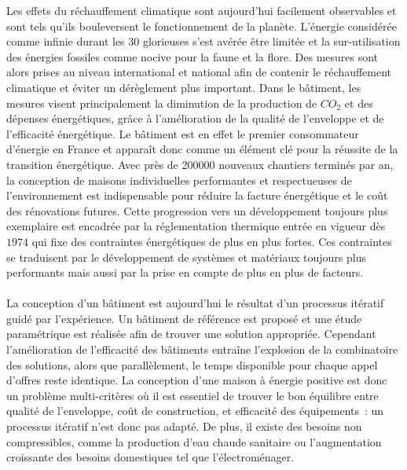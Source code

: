 

Les effets du réchauffement climatique sont aujourd’hui facilement observables et sont
tels qu’ils bouleversent le fonctionnement de la planète. L’énergie considérée comme
infinie durant les \num{30} glorieuses s’est avérée être limitée et la sur-utilisation des
énergies fossiles comme nocive pour la faune et la flore. Des mesures sont alors prises au
niveau international et national afin de contenir le réchauffement climatique et éviter un
dérèglement plus important. Dans le bâtiment, les mesures visent principalement la
diminution de la production de $CO_{2}$ et des dépenses énergétiques, grâce à
l’amélioration de la qualité de l’enveloppe et de l’efficacité énergétique. Le bâtiment
est en effet le premier consommateur d’énergie en France et apparaît donc comme un élément
clé pour la réussite de la transition énergétique. Avec près de \num{200000} nouveaux
chantiers terminés par an, la conception de maisons individuelles performantes et
respectueuses de l’environnement est indispensable pour réduire la facture énergétique et
le coût des rénovations futures. Cette progression vers un développement toujours plus
exemplaire est encadrée par la réglementation thermique entrée en vigueur dès $1974$ qui
fixe des contraintes énergétiques de plus en plus fortes. Ces contraintes
se traduisent par le développement de systèmes et matériaux toujours plus performants
mais aussi par la prise en compte de plus en plus de facteurs.


\paragraph{} %
La conception d’un bâtiment est aujourd’hui le résultat d’un processus itératif guidé par
l’expérience. Un bâtiment de référence est proposé et une étude paramétrique est réalisée
afin de trouver une solution appropriée. Cependant l’amélioration de l’efficacité des
bâtiments entraîne l’explosion de la combinatoire des solutions, alors que parallèlement,
le temps disponible pour chaque appel d’offres reste identique. La conception d’une
maison à énergie positive est donc un problème multi-critères où il est essentiel de
trouver le bon équilibre entre qualité de l’enveloppe, coût de construction, et efficacité
des équipements~: un processus itératif n’est donc pas adapté. De plus, il existe des
besoins non compressibles, comme la production d’eau chaude sanitaire ou l’augmentation
croissante des besoins domestiques tel que l’électroménager.

